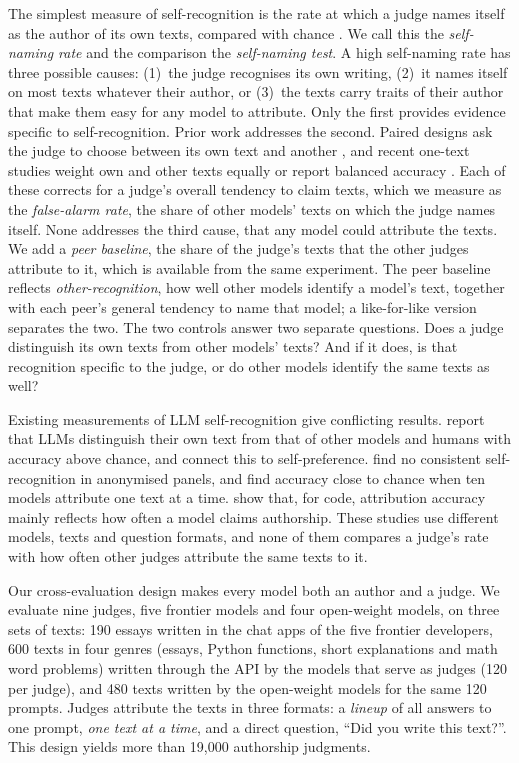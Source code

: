The simplest measure of self-recognition is the rate at which a judge names
itself as the author of its own texts, compared with chance
\citep{davidson2024anonymized}. We call this the \emph{self-naming rate} and
the comparison the \emph{self-naming test}. A high self-naming rate has three
possible causes: (1)~the judge recognises its own writing, (2)~it names itself
on most texts whatever their author, or (3)~the texts carry traits of their
author that make them easy for any model to attribute. Only the first provides evidence specific to self-recognition.
Prior work addresses the second. Paired designs ask the judge to choose
between its own text and another
\citep{panickssery2024selfpreference, ackerman2025inspection}, and recent
one-text studies weight own and other texts equally or report balanced
accuracy \citep{stamand2026sgtr, barkhordar2026stylenotself}. Each of these
corrects for a judge's overall tendency to claim texts, which we measure as
the \emph{false-alarm rate}, the share of other models' texts on which the
judge names itself. None addresses the third cause, that any model could
attribute the texts. We add a \emph{peer
baseline}, the share of the judge's texts that the other judges attribute to
it, which is available from the same experiment. The peer baseline reflects
\emph{other-recognition}, how well other models identify a model's text,
together with each peer's general tendency to name that model; a
like-for-like version separates the two. The two controls answer two separate
questions. Does a judge distinguish its own texts from other models' texts?
And if it does, is that recognition specific to the judge, or do other models
identify the same texts as well?

Existing measurements of LLM self-recognition give conflicting results.
\citet{panickssery2024selfpreference} report that LLMs distinguish their own
text from that of other models and humans with accuracy above chance, and
connect this to self-preference. \citet{davidson2024anonymized} find no
consistent self-recognition in anonymised panels, and
\citet{bai2025selfrecognition} find accuracy close to chance when ten models
attribute one text at a time. \citet{barkhordar2026stylenotself} show that,
for code, attribution accuracy mainly reflects how often a model claims
authorship. These studies use different models, texts and question formats,
and none of them compares a judge's rate with how often other judges attribute
the same texts to it.

Our cross-evaluation design makes every model both an author and a judge. We
evaluate nine judges, five frontier models and four open-weight models, on
three sets of texts: 190 essays written in the chat apps of the five frontier
developers, 600 texts in four genres (essays, Python functions, short
explanations and math word problems) written through the API by the models that
serve as judges (120 per judge), and 480 texts written by the open-weight
models for the same 120 prompts. Judges attribute the texts in three formats:
a \emph{lineup} of all answers to one prompt, \emph{one text at a time}, and a
direct question, ``Did you write this text?''. This design yields more than
19,000 authorship judgments.

